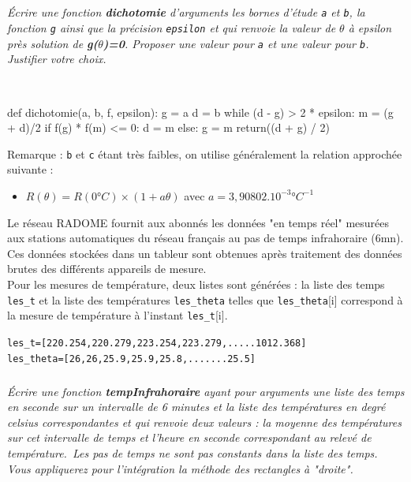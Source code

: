 \documentclass[10pt,fleqn]{article} %
\begin{document}
\subparagraph{}
\textit{Écrire une fonction \textbf{dichotomie} d'arguments les bornes d'étude \texttt{a} et \texttt{b}, la fonction \texttt{g} ainsi que la précision \texttt{epsilon} et qui renvoie la valeur de $\theta$ à epsilon près solution de \textbf{g($\theta$)=0}. Proposer une valeur pour \texttt{a} et une valeur pour \texttt{b}. Justifier votre choix.}

\ifprof
\begin{corrige}~\
\begin{python}
def dichotomie(a, b, f, epsilon):
    g = a
    d = b
    while (d - g) > 2 * epsilon:
        m = (g + d)/2
        if f(g) * f(m) <= 0:
            d = m
        else:
            g = m
    return((d + g) / 2)
\end{python}
\end{corrige}
\else
\fi

\vspace{0.5cm}
Remarque : \texttt{b} et \texttt{c} étant très faibles, on utilise généralement la relation approchée suivante :
\begin{itemize}
	\item $R(\theta)=R(0°C)\times(1+a\theta)$ avec $a=3,90802.10^{-3}°C^{-1}$
\end{itemize}

\vspace{0.5cm}
Le réseau RADOME fournit aux abonnés les données "en temps réel" mesurées aux stations automatiques du réseau français au pas de temps infrahoraire (6mn).\\
Ces données stockées dans un tableur sont obtenues après traitement des données brutes des différents appareils de mesure.\\
Pour les mesures de température, deux listes sont générées : la liste des temps \texttt{les\_t} et la liste des températures \texttt{les\_theta} telles que \texttt{les\_theta}[i] correspond à la mesure de température à l'instant \texttt{les\_t}[i].

\texttt{les\_t=[220.254,220.279,223.254,223.279,.....1012.368]}\\
\texttt{les\_theta=[26,26,25.9,25.9,25.8,.......25.5]}

\subparagraph{}
\textit{Écrire une fonction \textbf{tempInfrahoraire} ayant pour arguments une liste des temps en seconde sur un intervalle de 6 minutes et la liste des températures en degré celsius correspondantes et qui renvoie deux valeurs : la moyenne des températures sur cet intervalle de temps et l'heure en seconde correspondant au relevé de température.\
Les pas de temps ne sont pas constants dans la liste des temps. Vous appliquerez pour l'intégration la méthode des rectangles à "droite".}
\end{document}
